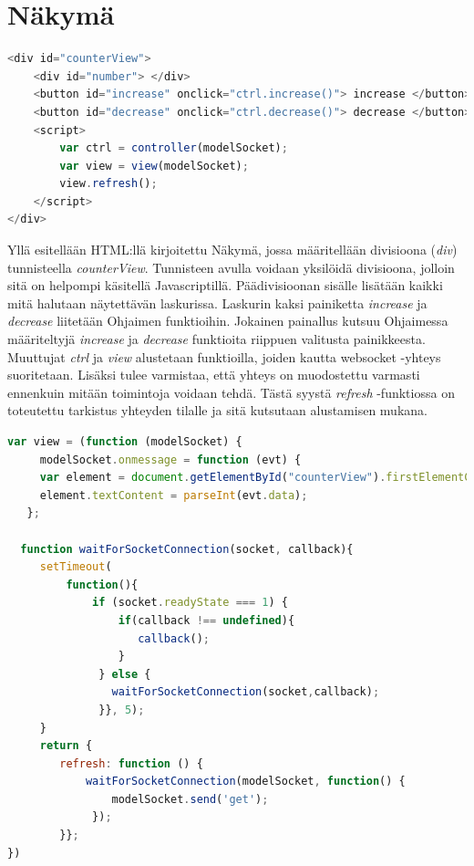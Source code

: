 \documentclass[utf8]{gradu3}
\begin{document}
\section{Näkymä}

\begin{lstlisting}[language=Javascript]
<div id="counterView">
    <div id="number"> </div>
    <button id="increase" onclick="ctrl.increase()"> increase </button>
    <button id="decrease" onclick="ctrl.decrease()"> decrease </button>
    <script>
        var ctrl = controller(modelSocket);
        var view = view(modelSocket);
        view.refresh();
    </script>
</div>
\end{lstlisting}

Yllä esitellään HTML:llä kirjoitettu Näkymä, jossa määritellään divisioona (\emph{div}) tunnisteella \emph{counterView}. Tunnisteen avulla voidaan yksilöidä divisioona, jolloin sitä on helpompi käsitellä Javascriptillä. Päädivisioonan sisälle lisätään kaikki mitä halutaan  näytettävän laskurissa. Laskurin kaksi painiketta \emph{increase} ja \emph{decrease} liitetään Ohjaimen funktioihin. Jokainen painallus kutsuu Ohjaimessa määriteltyjä \emph{increase} ja \emph{decrease} funktioita riippuen valitusta painikkeesta. Muuttujat  \emph{ctrl} ja \emph{view} alustetaan funktioilla, joiden kautta websocket -yhteys suoritetaan. Lisäksi tulee varmistaa, että yhteys on muodostettu varmasti ennenkuin mitään toimintoja voidaan tehdä. Tästä syystä \emph{refresh} -funktiossa on toteutettu tarkistus yhteyden tilalle ja sitä kutsutaan alustamisen mukana.

\begin{lstlisting}[language=Javascript]
var view = (function (modelSocket) {
     modelSocket.onmessage = function (evt) {
     var element = document.getElementById("counterView").firstElementChild;
     element.textContent = parseInt(evt.data);
   };

  function waitForSocketConnection(socket, callback){
     setTimeout(
         function(){
             if (socket.readyState === 1) {
                 if(callback !== undefined){
                    callback();
                 }
              } else {
                waitForSocketConnection(socket,callback);
              }}, 5);
     }
     return {
        refresh: function () {
            waitForSocketConnection(modelSocket, function() {
                modelSocket.send('get');
             });
        }};
})
\end{lstlisting}
\end{document}
